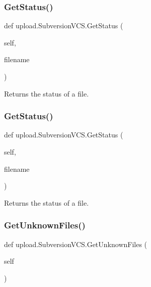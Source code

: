 \subsubsection{\texorpdfstring{GetStatus()}{GetStatus()}\hspace{0.1cm}{\footnotesize\ttfamily [1/2]}}
{\footnotesize\ttfamily def upload.\+Subversion\+V\+C\+S.\+Get\+Status (\begin{DoxyParamCaption}\item[{}]{self,  }\item[{}]{filename }\end{DoxyParamCaption})}

\begin{DoxyVerb}Returns the status of a file.\end{DoxyVerb}
 \mbox{\label{classupload_1_1SubversionVCS_ac3785eb1fa561088206d01570f9fe982}} 
\subsubsection{\texorpdfstring{GetStatus()}{GetStatus()}\hspace{0.1cm}{\footnotesize\ttfamily [2/2]}}
{\footnotesize\ttfamily def upload.\+Subversion\+V\+C\+S.\+Get\+Status (\begin{DoxyParamCaption}\item[{}]{self,  }\item[{}]{filename }\end{DoxyParamCaption})}

\begin{DoxyVerb}Returns the status of a file.\end{DoxyVerb}
 \mbox{\label{classupload_1_1SubversionVCS_a494ba1010992d83cac015bc396ab693a}} 
\subsubsection{\texorpdfstring{GetUnknownFiles()}{GetUnknownFiles()}\hspace{0.1cm}{\footnotesize\ttfamily [1/2]}}
{\footnotesize\ttfamily def upload.\+Subversion\+V\+C\+S.\+Get\+Unknown\+Files (\begin{DoxyParamCaption}\item[{}]{self }\end{DoxyParamCaption})}

